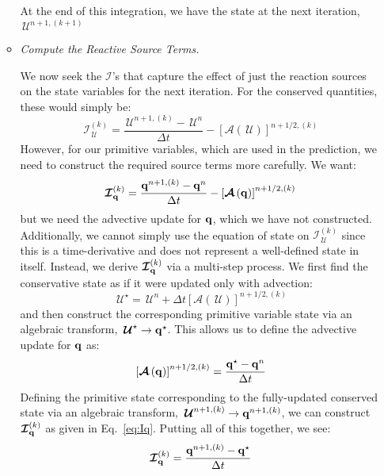 \documentclass[times,modern]{aastex63}
\newcommand{\Ic}{{\boldsymbol{\mathcal{I}}}}
\newcommand{\Uc}{{\,\bm{\mathcal{U}}}}
\newcommand{\qb}{{\bf q}}
\newcommand{\Adv}[1]{{\left [\boldsymbol{\mathcal{A}} \left(#1\right)\right]}}
\newcommand{\MarginPar}[1]{\marginpar{\vskip-\baselineskip\raggedright\tiny\sffamily\hrule\smallskip{\color{red}#1}\par\smallskip\hrule}}
\begin{document}
\begin{itemize}
\begin{itemize}
    At the end of this integration, we have the state at the next iteration,
    $\Uc^{n+1,(k+1)}$

  \item {\em Compute the Reactive Source Terms.}

    We now seek the $\Ic$'s that capture the effect of just the
    reaction sources on the state variables for the next iteration.
    For the conserved quantities, these would simply be: \MarginPar{fix signs on A}
    \begin{equation}
      \Ic^{(k)}_{\Uc} = \frac{\Uc^{n+1,(k)} - \Uc^n}{\Delta t} - \Adv{\Uc}^{n+1/2,(k)}
    \end{equation}
    However, for our primitive variables, which are used in the
    prediction, we need to construct the required source terms more
    carefully.  We want:
    \begin{equation}
      \label{eq:Iq}
      \Ic^{(k)}_{\qb} = \frac{\qb^{n+1,(k)} - \qb^n}{\Delta t} - \Adv{\qb}^{n+1/2,(k)}
    \end{equation}
    but we need the advective update for $\qb$, which we have not
    constructed.  Additionally, we cannot simply use the equation of
    state on $\Ic^{(k)}_{\Uc}$ since this is a time-derivative and
    does not represent a well-defined state in itself.  Instead, we
    derive $\Ic^{(k)}_{\qb}$ via a multi-step process.  We first find
    the conservative state as if it were updated only with advection:
    \begin{equation}
      \Uc^\star = \Uc^n + \Delta t \Adv{\Uc}^{n+1/2,(k)}
    \end{equation}
    and then construct the corresponding primitive variable state via an algebraic transform,
    $\Uc^\star \rightarrow \qb^\star$.
    This allows us to define the advective update for $\qb$ as:
    \begin{equation}
      \Adv{\qb}^{n+1/2,(k)} = \frac{\qb^\star - \qb^n}{\Delta t}
    \end{equation}
    Defining the primitive state corresponding to the fully-updated
    conserved state via an algebraic transform, $\Uc^{n+1,(k)}
    \rightarrow \qb^{n+1,(k)}$, we can construct $\Ic^{(k)}_{\qb}$ as given
    in Eq.~\ref{eq:Iq}.
    Putting all of this together, we see:
    \begin{equation}
      \Ic^{(k)}_{\qb} = \frac{\qb^{n+1,(k)} - \qb^\star}{\Delta t}
    \end{equation}





  \end{itemize}

\end{itemize}
\end{document}
